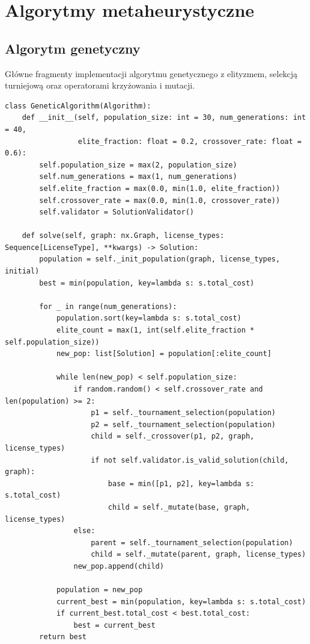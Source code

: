 \section{Algorytmy metaheurystyczne}
\subsection{Algorytm genetyczny}
Główne fragmenty implementacji algorytmu genetycznego z elityzmem,
selekcją turniejową oraz operatorami krzyżowania i mutacji.

    {\footnotesize
        \begin{verbatim}
class GeneticAlgorithm(Algorithm):
    def __init__(self, population_size: int = 30, num_generations: int = 40,
                 elite_fraction: float = 0.2, crossover_rate: float = 0.6):
        self.population_size = max(2, population_size)
        self.num_generations = max(1, num_generations)
        self.elite_fraction = max(0.0, min(1.0, elite_fraction))
        self.crossover_rate = max(0.0, min(1.0, crossover_rate))
        self.validator = SolutionValidator()

    def solve(self, graph: nx.Graph, license_types: Sequence[LicenseType], **kwargs) -> Solution:
        population = self._init_population(graph, license_types, initial)
        best = min(population, key=lambda s: s.total_cost)

        for _ in range(num_generations):
            population.sort(key=lambda s: s.total_cost)
            elite_count = max(1, int(self.elite_fraction * self.population_size))
            new_pop: list[Solution] = population[:elite_count]

            while len(new_pop) < self.population_size:
                if random.random() < self.crossover_rate and len(population) >= 2:
                    p1 = self._tournament_selection(population)
                    p2 = self._tournament_selection(population)
                    child = self._crossover(p1, p2, graph, license_types)
                    if not self.validator.is_valid_solution(child, graph):
                        base = min([p1, p2], key=lambda s: s.total_cost)
                        child = self._mutate(base, graph, license_types)
                else:
                    parent = self._tournament_selection(population)
                    child = self._mutate(parent, graph, license_types)
                new_pop.append(child)

            population = new_pop
            current_best = min(population, key=lambda s: s.total_cost)
            if current_best.total_cost < best.total_cost:
                best = current_best
        return best


\end{verbatim}}
